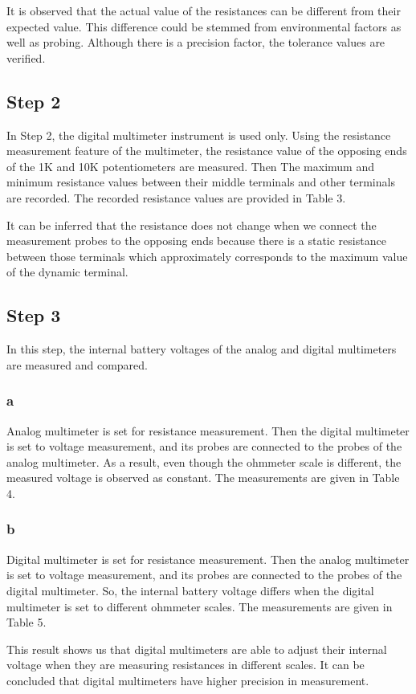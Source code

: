 \documentclass[letterpaper,12pt]{article}
\begin{document}
It is observed that the actual value of the resistances can be different from their expected value. This difference could be stemmed from environmental factors as well as probing. Although there is a precision factor, the tolerance values are verified. 
\subsection{Step 2}
In Step 2, the digital multimeter instrument is used only. Using the resistance measurement feature of the multimeter, the resistance value of the opposing ends of the 1K and 10K potentiometers are measured. Then The maximum and minimum resistance values between their middle terminals and other terminals are recorded.
The recorded resistance values are provided in Table 3.

It can be inferred that the resistance does not change when we connect the measurement probes to the opposing ends because there is a static resistance between those terminals which approximately corresponds to the maximum value of the dynamic terminal.  
\subsection{Step 3}
In this step, the internal battery voltages of the analog and digital multimeters are measured and compared.
\subsubsection{a}
Analog multimeter is set for resistance measurement. Then the digital multimeter is set to voltage measurement, and its probes are connected to the probes of the analog multimeter. As a result, even though the ohmmeter scale is different, the measured voltage is observed as constant. The measurements are given in Table 4.

\subsubsection{b}
Digital multimeter is set for resistance measurement. Then the analog multimeter is set to voltage measurement, and its probes are connected to the probes of the digital multimeter. So, the internal battery voltage differs when the digital multimeter is set to different ohmmeter scales. The measurements are given in Table 5.


This result shows us that digital multimeters are able to adjust their internal voltage when they are measuring resistances in different scales. It can be concluded that digital multimeters have higher precision in measurement.
\end{document}

